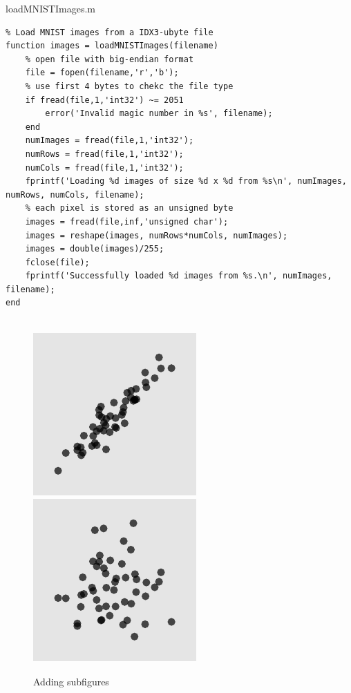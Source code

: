 \documentclass[fleqn]{rbfin}
\begin{document}
loadMNISTImages.m
\begin{lstlisting}
% Load MNIST images from a IDX3-ubyte file
function images = loadMNISTImages(filename)
    % open file with big-endian format
    file = fopen(filename,'r','b');
    % use first 4 bytes to chekc the file type
    if fread(file,1,'int32') ~= 2051
        error('Invalid magic number in %s', filename);
    end
    numImages = fread(file,1,'int32');
    numRows = fread(file,1,'int32');
    numCols = fread(file,1,'int32');
    fprintf('Loading %d images of size %d x %d from %s\n', numImages, numRows, numCols, filename);
    % each pixel is stored as an unsigned byte
    images = fread(file,inf,'unsigned char');
    images = reshape(images, numRows*numCols, numImages);
    images = double(images)/255;
    fclose(file);
    fprintf('Successfully loaded %d images from %s.\n', numImages, filename);
end


\end{lstlisting}

\begin{figure}[ht]
\begin{center}
\caption{Adding subfigures}\label{subfigures}
%
{\includegraphics{media/plot2a.pdf}}
%
{\includegraphics{media/plot2b.pdf}}
%
\end{center}
\end{figure}
\end{document}
